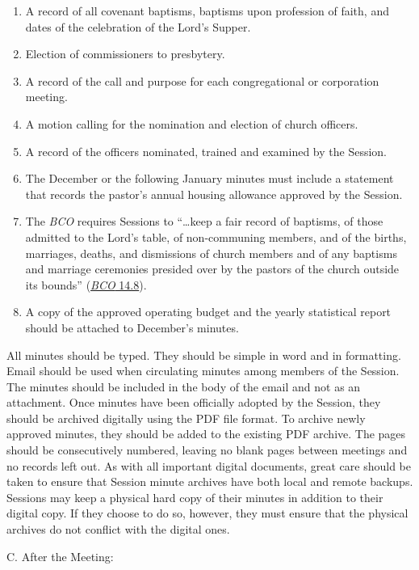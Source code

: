 \documentclass[
]{book}
\providecommand{\tightlist}{%
  \setlength{\itemsep}{0pt}\setlength{\parskip}{0pt}}
\begin{document}
\begin{enumerate}
\def\labelenumi{\arabic{enumi}.}
\tightlist
\item
  A record of all covenant baptisms, baptisms upon profession of faith, and dates of the celebration of the Lord's Supper.
\item
  Election of commissioners to presbytery.
\item
  A record of the call and purpose for each congregational or corporation meeting.
\item
  A motion calling for the nomination and election of church officers.
\item
  A record of the officers nominated, trained and examined by the Session.
\item
  The December or the following January minutes must include a statement that records the pastor's annual housing allowance approved by the Session.
\item
  The \emph{BCO} requires Sessions to ``\ldots keep a fair record of baptisms, of those admitted to the Lord's table, of non-communing members, and of the births, marriages, deaths, and dismissions of church members and of any baptisms and marriage ceremonies presided over by the pastors of the church outside its bounds'' (\href{https://bco.evangelpresbytery.com/form-of-government.html\#the-church-session}{\emph{BCO} 14.8}).
\item
  A copy of the approved operating budget and the yearly statistical report should be attached to December's minutes.
\end{enumerate}

All minutes should be typed. They should be simple in word and in formatting. Email should be used when circulating minutes among members of the Session. The minutes should be included in the body of the email and not as an attachment. Once minutes have been officially adopted by the Session, they should be archived digitally using the PDF file format. To archive newly approved minutes, they should be added to the existing PDF archive. The pages should be consecutively numbered, leaving no blank pages between meetings and no records left out. As with all important digital documents, great care should be taken to ensure that Session minute archives have both local and remote backups. Sessions may keep a physical hard copy of their minutes in addition to their digital copy. If they choose to do so, however, they must ensure that the physical archives do not conflict with the digital ones.

C. After the Meeting:
\end{document}
